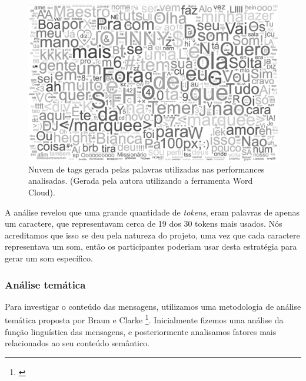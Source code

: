 \begin{figure}[ht!]

\includegraphics[width=1\linewidth]{pictures/cap3/wordcloud_pb}
\caption{Nuvem de tags gerada pelas palavras utilizadas nas performances analisadas. (Gerada pela autora utilizando a ferramenta Word Cloud).}
\label{fig:cloud}
\end{figure}

A análise revelou que uma grande quantidade de \emph{tokens}, eram palavras de apenas um caractere, que representavam cerca de 19 dos 30 tokens mais usados. Nós acreditamos que isso se deu pela natureza do projeto, uma vez que cada caractere representava um som, então os participantes poderiam usar desta estratégia para gerar um som específico. 


\subsubsection{Análise temática}
\label{sec:thematic}

Para investigar o conteúdo das mensagens, utilizamos uma metodologia de análise temática proposta por Braun e Clarke \footnote{\cite{Braun2006}}. Inicialmente fizemos uma análise da função linguística das mensagens, e posteriormente analisamos fatores mais relacionados ao seu conteúdo semântico.

